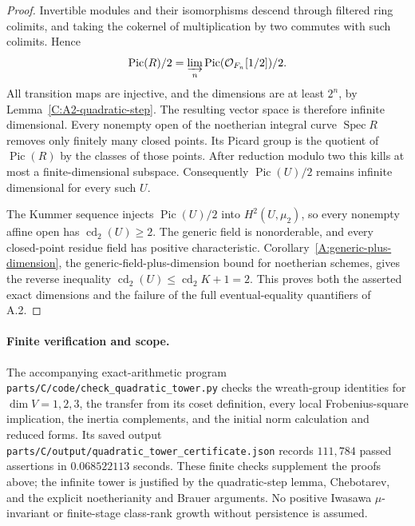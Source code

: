 \begin{proof}
Invertible modules and their isomorphisms descend through
filtered ring colimits, and taking the cokernel of multiplication
by two commutes with such colimits. Hence
\[
 \operatorname{Pic}(R)/2
     =\varinjlim_n \operatorname{Pic}(\mathcal O_{F_n}[1/2])/2.
\]
All transition maps are injective, and the dimensions are at least
$2^n$, by Lemma~\ref{C:A2-quadratic-step}. The resulting vector
space is therefore infinite dimensional. Every nonempty open
of the noetherian integral curve $\operatorname{Spec}R$ removes
only finitely many closed points. Its Picard group is the quotient
of $\operatorname{Pic}(R)$ by the classes of those points.
After reduction modulo two this kills at most a finite-dimensional
subspace. Consequently $\operatorname{Pic}(U)/2$ remains infinite
dimensional for every such $U$.

The Kummer sequence injects $\operatorname{Pic}(U)/2$ into
$H^2(U,\mu_2)$, so every nonempty affine open has
$\operatorname{cd}_2(U)\ge2$. The generic field is nonorderable,
and every closed-point residue field has positive characteristic.
Corollary~\ref{A:generic-plus-dimension},
the generic-field-plus-dimension bound for noetherian schemes,
gives the reverse
inequality $\operatorname{cd}_2(U)\le\operatorname{cd}_2K+1=2$.
This proves both the asserted exact dimensions and the failure
of the full eventual-equality quantifiers of A.2.
\end{proof}

\paragraph{Finite verification and scope.}
The accompanying exact-arithmetic program
\nolinkurl{parts/C/code/check_quadratic_tower.py} checks the wreath-group
identities for $\dim V=1,2,3$, the transfer from its coset definition,
every local Frobenius-square implication, the inertia complements,
and the initial norm calculation and reduced forms. Its saved output
\nolinkurl{parts/C/output/quadratic_tower_certificate.json} records
$111{,}784$ passed assertions in $0.068522113$ seconds. These finite checks
supplement the proofs above; the infinite tower is justified by the
quadratic-step lemma, Chebotarev, and the explicit noetherianity and
Brauer arguments. No positive Iwasawa $\mu$-invariant or finite-stage
class-rank growth without persistence is assumed.
